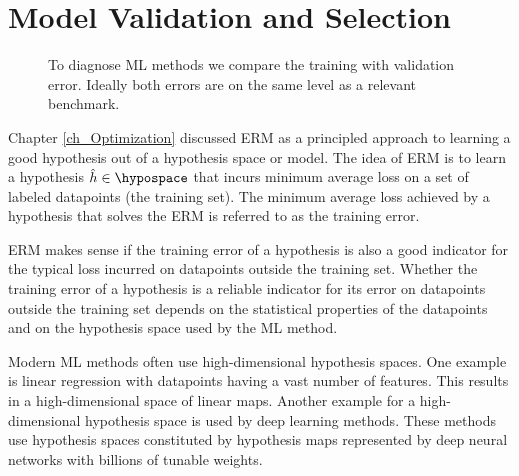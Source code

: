 \documentclass[12pt]{report}
\begin{document}
\newpage
\chapter{Model Validation and Selection} 
\label{ch_validation_selection}

\begin{figure}[htbp]
\begin{center}
\end{center}
\caption{To diagnose ML methods we compare the training with validation error. 
	Ideally both errors are on the same level as a relevant benchmark.}
 \label{fig_bars_val_sel}
\end{figure}



Chapter \ref{ch_Optimization} discussed ERM as a principled approach to learning a 
good hypothesis out of a hypothesis space or model. The idea of ERM is to learn a 
hypothesis $\hat{h} \in \hypospace$ that incurs minimum average loss on a set of 
labeled datapoints (the training set). The minimum average loss achieved by a 
hypothesis that solves the ERM is referred to as the training error. 

ERM makes sense if the training error of a hypothesis is also a good indicator for 
the typical loss incurred on datapoints outside the training set. Whether the training 
error of a hypothesis is a reliable indicator for its error on datapoints outside the 
training set depends on the statistical properties of the datapoints and on the 
hypothesis space used by the ML method.  

Modern ML methods often use high-dimensional hypothesis spaces. 
One example is linear regression with datapoints having a vast number 
of features. This results in a high-dimensional space of linear maps. 
Another example for a high-dimensional hypothesis space is used by 
deep learning methods. These methods use hypothesis spaces constituted 
by hypothesis maps represented  by deep neural networks with billions of 
tunable weights. 
\end{document}
